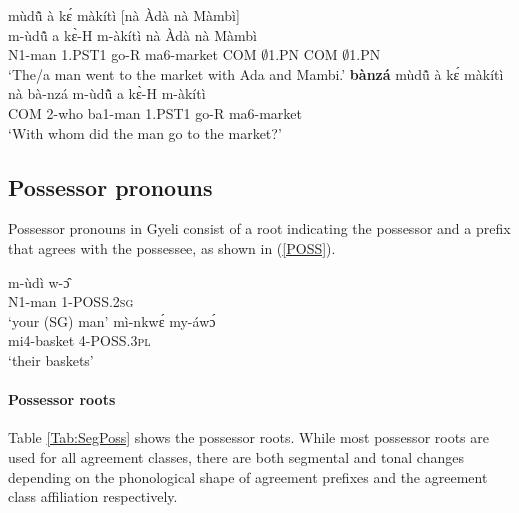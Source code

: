 \begin{exe}
\ex\label{banzá}
\begin{xlist}
\ex \label{banzá1}
  \glll    mùdũ̂ à kɛ́ màkítì [nà Àdà nà Màmbì] \\
           m-ùdũ̂ a kɛ̀-H m-àkítì nà Àdà nà Màmbì \\
              N1-man 1.PST1 go-R ma6-market COM $\emptyset$1.PN COM $\emptyset$1.PN \\
    \trans `The/a man went to the market with Ada and Mambi.'
\ex\label{banzá2}
  {\bfseries bànzá} mùdũ̂ à kɛ́ màkítì \\
          nà bà-nzá m-ùdũ̂ a kɛ̀-H m-àkítì \\
           COM 2-who ba1-man 1.PST1 go-R ma6-market\\
    \trans `With whom did the man go to the market?'
\end {xlist}
\end {exe}


\subsection{Possessor pronouns}
\label{sec:POSS}

\noindent Possessor pronouns in Gyeli consist of a root indicating the possessor and a prefix that agrees with the possessee, as shown in (\ref{POSS}).

\begin{exe}
\ex\label{POSS}
\begin{xlist}
\ex \label{POSS1}
  \gll     m-ùdì w-ɔ̂ \\
                N1-man 1-POSS.2\textsc{sg} \\
    \trans `your (SG) man'
\ex\label{POSS2}
 \gll     mì-nkwɛ́ my-áwɔ́ \\
                mi4-basket 4-POSS.3\textsc{pl} \\
    \trans `their baskets'
\end {xlist}
\end {exe}

\paragraph{Possessor roots}  Table \ref{Tab:SegPoss} shows the possessor roots. While most possessor roots are used for all agreement classes, there are both segmental and tonal changes depending on the phonological shape of agreement prefixes and the agreement class affiliation respectively.

